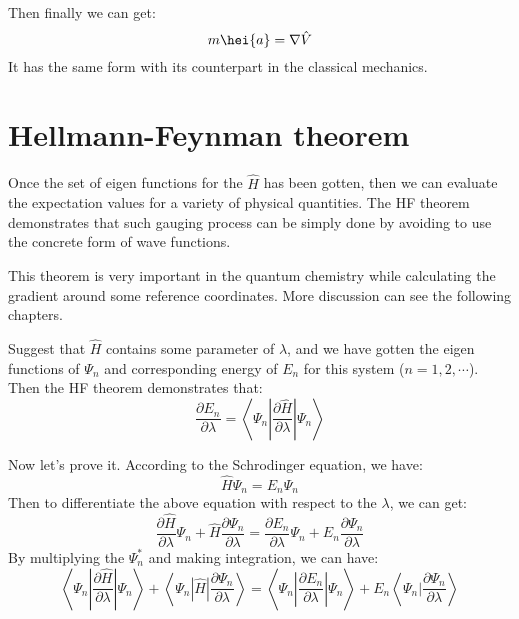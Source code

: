 Then finally we can get:
\begin{equation}\label{}
m \hei{a} = \nabla\hat{V}
\end{equation}
It has the same form with its counterpart in the classical
mechanics.

\section{Hellmann-Feynman theorem}
%
%
%
%
Once the set of eigen functions for the $\hat{H}$ has been gotten,
then we can evaluate the expectation values for a variety of
physical quantities. The HF theorem demonstrates that such gauging
process can be simply done by avoiding to use the concrete form of
wave functions.

This theorem is very important in the quantum chemistry while
calculating the gradient around some reference coordinates. More
discussion can see the following chapters.

Suggest that $\hat{H}$ contains some parameter of $\lambda$, and we
have gotten the eigen functions of $\Psi_{n}$ and corresponding
energy of $E_{n}$ for this system ($n = 1, 2, \cdots$). Then the HF
theorem demonstrates that:
\begin{equation}\label{}
\frac{\partial E_{n}}{\partial \lambda} =
\left\langle\Psi_{n}|\frac{\partial \hat{H}}{\partial
\lambda}|\Psi_{n}\right\rangle
\end{equation}

Now let's prove it. According to the Schrodinger equation, we have:
\begin{equation}\label{}
\hat{H}\Psi_{n} = E_{n}\Psi_{n}
\end{equation}
Then to differentiate the above equation with respect to the
$\lambda$, we can get:
\begin{equation}\label{}
\frac{\partial \hat{H}}{\partial \lambda}\Psi_{n} +
\hat{H}\frac{\partial \Psi_{n}}{\partial \lambda} = \frac{\partial
E_{n}}{\partial \lambda}\Psi_{n} +E_{n}\frac{\partial
\Psi_{n}}{\partial \lambda}
\end{equation}
By multiplying the $\Psi^{*}_{n}$ and making integration, we can
have:
\begin{equation}\label{}
\left\langle\Psi_{n}|\frac{\partial \hat{H}}{\partial
\lambda}|\Psi_{n}\right\rangle +
\left\langle\Psi_{n}|\hat{H}|\frac{\partial \Psi_{n}}{\partial
\lambda}\right\rangle = \left\langle\Psi_{n}|\frac{\partial
E_{n}}{\partial \lambda}|\Psi_{n}\right\rangle +
E_{n}\left\langle\Psi_{n}|\frac{\partial \Psi_{n}}{\partial
\lambda}\right\rangle
\end{equation}

